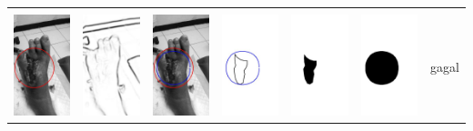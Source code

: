 \begin{table}[H]
\begin{tabular}{|m{0.7in}|m{0.7in}|m{0.7in}|m{0.7in}|m{0.7in}|m{0.7in}|m{0.7in}|}
		&  &  & & & &  \\
		\includegraphics[width=0.7in]{dataset/dataset_3/luka_merah/ready/2_integer_init.jpg}&
		\includegraphics[width=0.7in]{dataset/dataset_3/luka_merah/ready/2_integer_ext.jpg}&
		\includegraphics[width=0.7in]{dataset/dataset_3/luka_merah/ready/2_integer_result.jpg}&
		\includegraphics[width=0.7in]{dataset/dataset_3/luka_merah/ready/2_gt_r_integer.jpg}&
		\includegraphics[width=0.7in]{dataset/dataset_3/luka_merah/ready/2_r.jpg}&
		\includegraphics[width=0.7in]{dataset/dataset_3/luka_merah/ready/2_integer_r.jpg}&
		gagal\\
		\hline
		

\end{tabular}
\end{table}
